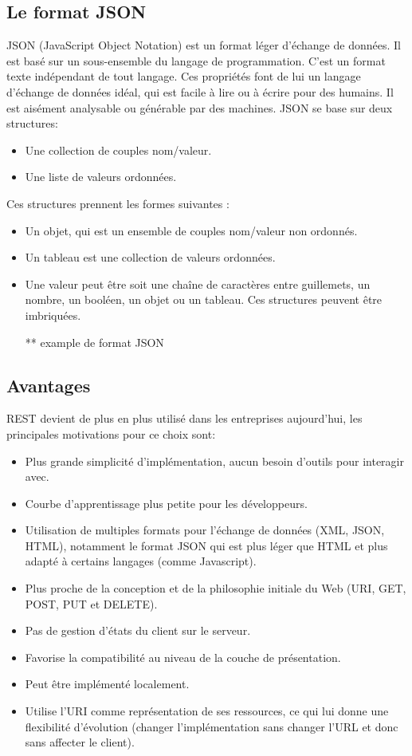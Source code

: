			\subsection{Le format JSON}
JSON (JavaScript Object Notation) est un format léger d'échange de données. Il est basé sur un sous-ensemble du langage de programmation. C’est un format texte indépendant de tout langage.
Ces propriétés font de lui un langage d'échange de données idéal, qui est facile à lire ou à écrire pour des humains. Il est aisément analysable ou générable par des machines. 
JSON se base sur deux structures:
\begin{itemize}

			\item Une collection de couples nom/valeur. 
			\item Une liste de valeurs ordonnées. 
\end{itemize}
Ces structures prennent les formes suivantes :
\begin{itemize}
\item Un objet, qui est un ensemble de couples nom/valeur non ordonnés. 
\item Un tableau est une collection de valeurs ordonnées. 
\item Une valeur peut être soit une chaîne de caractères entre guillemets, un nombre, un booléen, un objet ou un tableau. Ces structures peuvent être imbriquées.

** example de format JSON
\end{itemize}

			\subsection{Avantages}
	REST devient de plus en plus utilisé dans les entreprises aujourd'hui, les principales motivations pour ce choix sont:\cite{refSOAPvsREST}
			\begin{itemize}
\item Plus grande simplicité d'implémentation, aucun besoin d'outils pour interagir avec.
\item Courbe d'apprentissage plus petite pour les développeurs.
\item Utilisation de multiples formats pour l'échange de données (XML, JSON, HTML), notamment le format JSON qui est plus léger que HTML et plus adapté à certains langages (comme Javascript).
\item Plus proche de la conception et de la philosophie initiale du Web (URI, GET, POST, PUT et DELETE).
\item Pas de gestion d'états du client sur le serveur.
\item Favorise la compatibilité au niveau de la couche de présentation.
\item Peut être implémenté localement.
\item Utilise l'URI comme représentation de ses ressources, ce qui lui donne une flexibilité d'évolution (changer l'implémentation sans changer l'URL et donc sans affecter le client).
			\end{itemize}
